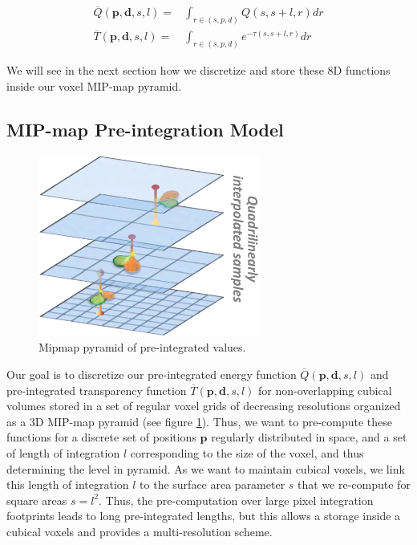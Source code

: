 \begin{equation*}
	\begin{aligned}
		\overline{Q}(\mathbf{p},\mathbf{d},s,l)=&\int_{r\in (s,p,d)}Q(s,s+l,r)dr\\
		\overline{T}(\mathbf{p},\mathbf{d},s,l)=&\int_{r\in (s,p,d)}e^{-\tau(s,s+l,r)}dr
	\end{aligned}
\end{equation*} 

We will see in the next section how we discretize and store these 8D functions inside our voxel MIP-map pyramid. 




\subsection{MIP-map Pre-integration Model}\label{sec:mip-map-pre-integration-model}
\begin{figure}
\sidecaption
	\includegraphics[width=0.65\textwidth]{graphics/vct/vct-7-6}
	\caption{Mipmap pyramid of pre-integrated values.}
	\label{f:vct-mipmap-pyramid}
\end{figure}

Our goal is to discretize our pre-integrated energy function $\overline{Q}(\mathbf{p},\mathbf{d},s,l)$ and pre-integrated transparency function $\overline{T}(\mathbf{p},\mathbf{d},s,l)$ for non-overlapping cubical volumes stored in a set of regular voxel grids of decreasing resolutions organized as a 3D MIP-map pyramid (see figure \ref{f:vct-mipmap-pyramid}). Thus, we want to pre-compute these functions for a discrete set of positions $\mathbf{p}$ regularly distributed in space, and a set of length of integration $l$ corresponding to the size of the voxel, and thus determining the level in pyramid. As we want to maintain cubical voxels, we link this length of integration $l$ to the surface area parameter $s$ that we re-compute for square areas $s=l^{2}$. Thus, the pre-computation over large pixel integration footprints leads to long pre-integrated lengths, but this allows a storage inside a cubical voxels and provides a multi-resolution scheme.

